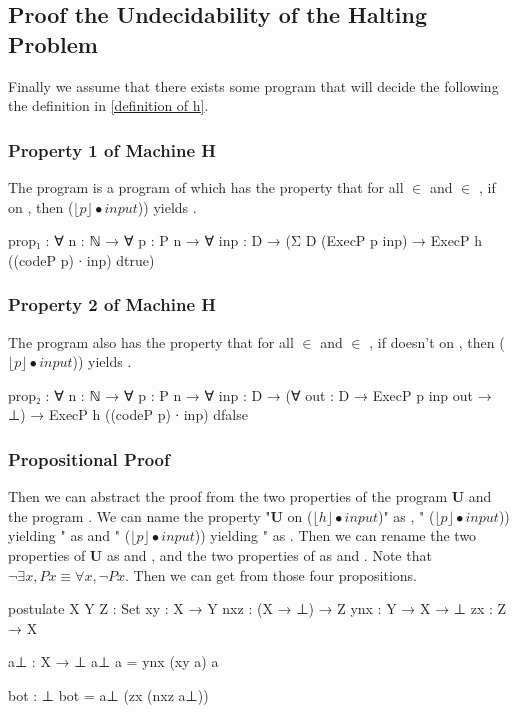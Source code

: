 \subsection{Proof the Undecidability of the Halting Problem}
Finally we assume that there exists some program  that will decide the  following the definition in \ref{definition of h}.
\subsubsection{Property 1 of Machine H}
The program  is a program of \WHILE which has the property that for all  $\in$  and  $\in$ , if  \textbf{} on , then  ($\lfloor p\rfloor \bullet input$)) yields .
\begin{code}
prop₁ : ∀ {n : ℕ} → ∀ {p : P n} → ∀ {inp : D}
	→ (Σ D (ExecP p inp) 
	→ ExecP h ((codeP p) ∙ inp) dtrue)
\end{code}
\subsubsection{Property 2 of Machine H}
The program  also has the property that for all  $\in$  and  $\in$ , if  doesn't \textbf{} on , then  ($\lfloor p\rfloor \bullet input$)) yields .
\begin{code}
prop₂ : ∀ {n : ℕ} → ∀ {p : P n} → ∀ {inp : D}
	→ (∀ {out : D} → ExecP p inp out → ⊥) 
	→ ExecP h ((codeP p) ∙ inp) dfalse
\end{code}
\subsubsection{Propositional Proof}\label{definition: propositional proof}
Then we can abstract the proof from the two properties of the program \textbf{U} and the program .
We can name the property "\textbf{U}  on ($\lfloor h\rfloor \bullet input$)" as , " ($\lfloor p\rfloor \bullet input$)) yielding " as  and " ($\lfloor p\rfloor \bullet input$)) yielding " as .
Then we can rename the two properties of \textbf{U} as  and , and the two properties of  as  and .
Note that $\neg\exists x, P x \equiv \forall x, \neg P x$.
Then we can get  from those four propositions.
\begin{code}[fontsize=\small]
postulate
  X Y Z : Set
  xy  : X → Y
  nxz : (X → ⊥) → Z
  ynx : Y → X → ⊥
  zx  : Z → X

a⊥ : X → ⊥
a⊥ a = ynx (xy a) a

bot : ⊥
bot = a⊥ (zx (nxz a⊥))
\end{code}
